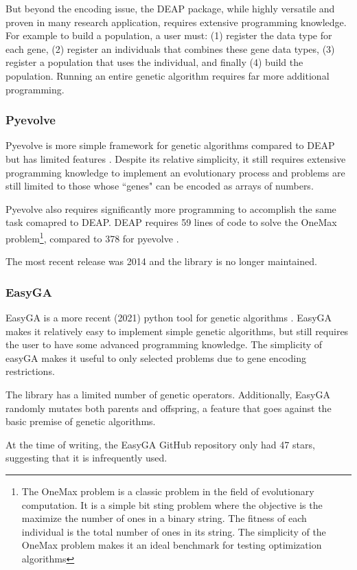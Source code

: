 \documentclass[12pt]{report}
\begin{document}
But beyond the encoding issue, the DEAP package, while highly versatile and proven in many research application, requires extensive programming knowledge. For example to build a population, a user must: (1) register the data type for each gene, (2) register an individuals that combines these gene data types, (3) register a population that uses the individual, and finally (4) build the population. Running an entire genetic algorithm requires far more additional programming. 

\subsubsection{Pyevolve}
Pyevolve is more simple framework for genetic algorithms compared to DEAP but has limited features \cite{pyevolve}. Despite its relative simplicity, it still requires extensive programming knowledge to implement an evolutionary process and problems are still limited to those whose ``genes" can be encoded as arrays of numbers. 

Pyevolve also requires significantly more programming to accomplish the same task comapred to DEAP. DEAP requires 59 lines of code to solve the OneMax problem\footnote{The OneMax problem is a classic problem in the field of evolutionary computation. It is a simple bit sting problem where the objective is the maximize the number of ones in a binary string. The fitness of each individual is the total number of ones in its string. The simplicity of the OneMax problem makes it an ideal benchmark for testing optimization algorithms}, compared to 378 for pyevolve \cite{LEAP}. 

The most recent release was 2014 and the library is no longer maintained.

\subsubsection{EasyGA}
EasyGA is a more recent (2021) python tool for genetic algorithms \cite{easyGA}. EasyGA makes it relatively easy to implement simple genetic algorithms, but still requires the user to have some advanced programming knowledge. The simplicity of easyGA makes it useful to only selected problems due to gene encoding restrictions.

The library has a limited number of genetic operators. Additionally, EasyGA randomly mutates both parents and offspring, a feature that goes against the basic premise of genetic algorithms. 

At the time of writing, the EasyGA GitHub repository only had 47 stars, suggesting that it is infrequently used.
\end{document}
